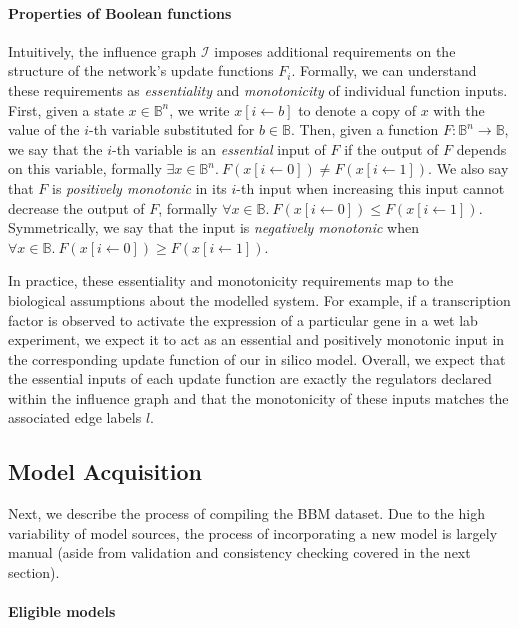 \documentclass[fleqn,10pt]{wlscirep}
\begin{document}
\paragraph{Properties of Boolean functions} Intuitively, the influence graph $\mathcal{I}$ imposes additional requirements on the structure of the network's update functions $F_i$. Formally, we can understand these requirements as \emph{essentiality} and \emph{monotonicity} of individual function inputs. First, given a state $x \in \mathbb{B}^n$, we write $x[i \gets b]$ to denote a copy of $x$ with the value of the $i$-th variable substituted for $b \in \mathbb{B}$. Then, given a function $F: \mathbb{B}^n \to \mathbb{B}$, we say that the $i$-th variable is an \emph{essential} input of $F$ if the output of $F$ depends on this variable, formally $\exists x \in \mathbb{B}^n.~F(x[i \gets 0]) \not= F(x[i \gets 1])$. We also say that $F$ is \emph{positively monotonic} in its $i$-th input when increasing this input cannot decrease the output of $F$, formally $\forall x \in \mathbb{B}.~F(x[i \gets 0]) \leq F(x[i \gets 1])$. Symmetrically, we say that the input is \emph{negatively monotonic} when $\forall x \in \mathbb{B}.~F(x[i \gets 0]) \geq F(x[i \gets 1])$.

In practice, these essentiality and monotonicity requirements map to the biological assumptions about the modelled system. For example, if a transcription factor is observed to activate the expression of a particular gene in a wet lab experiment, we expect it to act as an essential and positively monotonic input in the corresponding update function of our in silico model. Overall, we expect that the essential inputs of each update function are exactly the regulators declared within the influence graph and that the monotonicity of these inputs matches the associated edge labels $l$.

\subsection*{Model Acquisition}

Next, we describe the process of compiling the BBM dataset. Due to the high variability of model sources, the process of incorporating a new model is largely manual (aside from validation and consistency checking covered in the next section).

\paragraph{Eligible models} 
\end{document}
